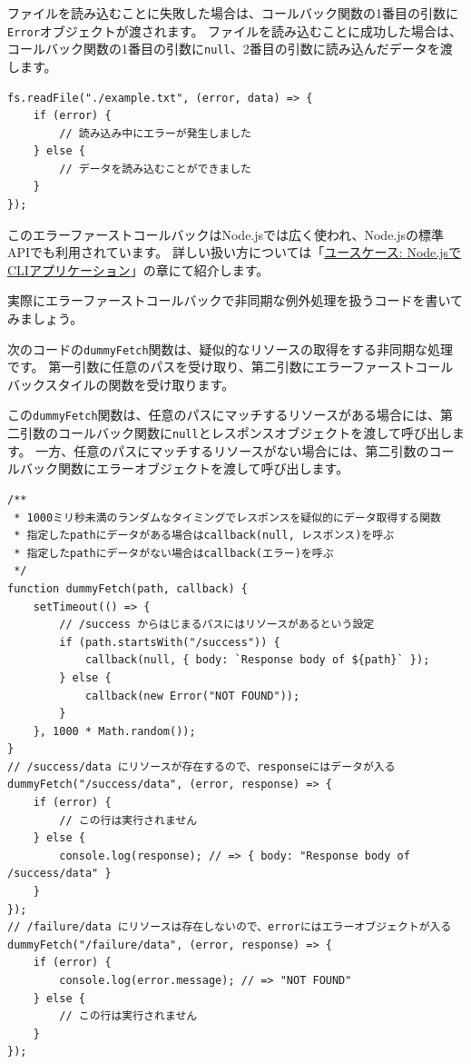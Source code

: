 ファイルを読み込むことに失敗した場合は、コールバック関数の1番目の引数に\texttt{Error}オブジェクトが渡されます。
ファイルを読み込むことに成功した場合は、コールバック関数の1番目の引数に\texttt{null}、2番目の引数に読み込んだデータを渡します。

\begin{lstlisting}
fs.readFile("./example.txt", (error, data) => {
    if (error) {
        // 読み込み中にエラーが発生しました
    } else {
        // データを読み込むことができました
    }
});
\end{lstlisting}

このエラーファーストコールバックはNode.jsでは広く使われ、Node.jsの標準APIでも利用されています。
詳しい扱い方については「\hyperlink{node-cli}{ユースケース:
Node.jsでCLIアプリケーション}」の章にて紹介します。

実際にエラーファーストコールバックで非同期な例外処理を扱うコードを書いてみましょう。

次のコードの\texttt{dummyFetch}関数は、疑似的なリソースの取得をする非同期な処理です。
第一引数に任意のパスを受け取り、第二引数にエラーファーストコールバックスタイルの関数を受け取ります。

この\texttt{dummyFetch}関数は、任意のパスにマッチするリソースがある場合には、第二引数のコールバック関数に\texttt{null}とレスポンスオブジェクトを渡して呼び出します。
一方、任意のパスにマッチするリソースがない場合には、第二引数のコールバック関数にエラーオブジェクトを渡して呼び出します。

\begin{lstlisting}
/**
 * 1000ミリ秒未満のランダムなタイミングでレスポンスを疑似的にデータ取得する関数
 * 指定したpathにデータがある場合はcallback(null, レスポンス)を呼ぶ
 * 指定したpathにデータがない場合はcallback(エラー)を呼ぶ
 */
function dummyFetch(path, callback) {
    setTimeout(() => {
        // /success からはじまるパスにはリソースがあるという設定
        if (path.startsWith("/success")) {
            callback(null, { body: `Response body of ${path}` });
        } else {
            callback(new Error("NOT FOUND"));
        }
    }, 1000 * Math.random());
}
// /success/data にリソースが存在するので、responseにはデータが入る
dummyFetch("/success/data", (error, response) => {
    if (error) {
        // この行は実行されません
    } else {
        console.log(response); // => { body: "Response body of /success/data" }
    }
});
// /failure/data にリソースは存在しないので、errorにはエラーオブジェクトが入る
dummyFetch("/failure/data", (error, response) => {
    if (error) {
        console.log(error.message); // => "NOT FOUND"
    } else {
        // この行は実行されません
    }
});
\end{lstlisting}


